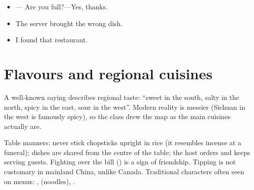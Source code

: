 \begin{itemize}
  \item {}--- Are you full?---Yes, thanks.
  \item {} The server brought the wrong dish.
  \item {} I found that restaurant.
\end{itemize}

\section{Flavours and regional cuisines}

A well-known saying describes regional taste: 
``sweet in the south, salty in the north, spicy in the east, sour in the west''. Modern
reality is messier (Sichuan in the west is famously spicy), so the class drew the map
as the main cuisines actually are.

\begin{center}
\end{center}

\begin{aside}
Table manners: never stick chopsticks upright in rice (it resembles incense at a
funeral); dishes are shared from the centre of the table; the host orders and keeps
serving guests. Fighting over the bill () is a sign of friendship. Tipping
is not customary in mainland China, unlike Canada. Traditional characters often seen on
menus:  ,   (noodles),  .
\end{aside}


